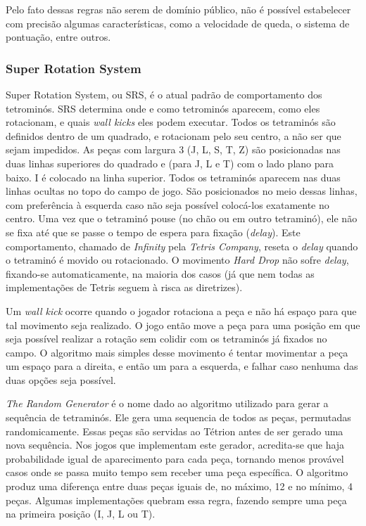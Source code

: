 \documentclass[
	12pt,				%
	openright,			%
	oneside,			%
	a4paper,			%
	brazil,				%
	]{abntex2}
\begin{document}
Pelo fato dessas regras não serem de domínio público, não é possível estabelecer com precisão algumas características, como a velocidade de queda, o sistema de pontuação, entre outros. 

\subsubsection{Super Rotation System}

Super Rotation System, ou SRS, é o atual padrão de comportamento dos tetrominós. SRS determina onde e como tetrominós aparecem, como eles rotacionam, e quais \textit{wall kicks} eles podem executar. Todos os tetraminós são definidos dentro de um quadrado, e rotacionam pelo seu centro, a não ser que sejam impedidos. As peças com largura 3 (J, L, S, T, Z) são posicionadas nas duas linhas superiores do quadrado e (para J, L e T) com o lado plano para baixo. I é colocado na linha superior. Todos os tetraminós aparecem nas duas linhas ocultas no topo do campo de jogo. São posicionados no meio dessas linhas, com preferência à esquerda caso não seja possível colocá-los exatamente no centro. Uma vez que o tetraminó pouse (no chão ou em outro tetraminó), ele não se fixa até que se passe o tempo de espera para fixação (\textit{delay}). Este comportamento, chamado de \textit{Infinity} pela \textit{Tetris Company}, reseta o \textit{delay} quando o tetraminó é movido ou rotacionado. O movimento \textit{Hard Drop} não sofre \textit{delay}, fixando-se automaticamente, na maioria dos casos (já que nem todas as implementações de Tetris seguem à risca as diretrizes).

Um \textit{wall kick} ocorre quando o jogador rotaciona a peça e não há espaço para que tal movimento seja realizado. O jogo então move a peça para uma posição em que seja possível realizar a rotação sem colidir com os tetraminós já fixados no campo. O algoritmo mais simples desse movimento é tentar movimentar a peça um espaço para a direita, e então um para a esquerda, e falhar caso nenhuma das duas opções seja possível.

\textit{The Random Generator} é o nome dado ao algoritmo utilizado para gerar a sequência de tetraminós. Ele gera uma sequencia de todos as peças, permutadas randomicamente. Essas peças são servidas ao Tétrion antes de ser gerado uma nova sequência. Nos jogos que implementam este gerador, acredita-se que haja probabilidade igual de aparecimento para cada peça, tornando menos provável casos onde se passa muito tempo sem receber uma peça específica. O algoritmo produz uma diferença entre duas peças iguais de, no máximo, 12 e no mínimo, 4 peças. Algumas implementações quebram essa regra, fazendo sempre uma peça na primeira posição (I, J, L ou T).
\end{document}
